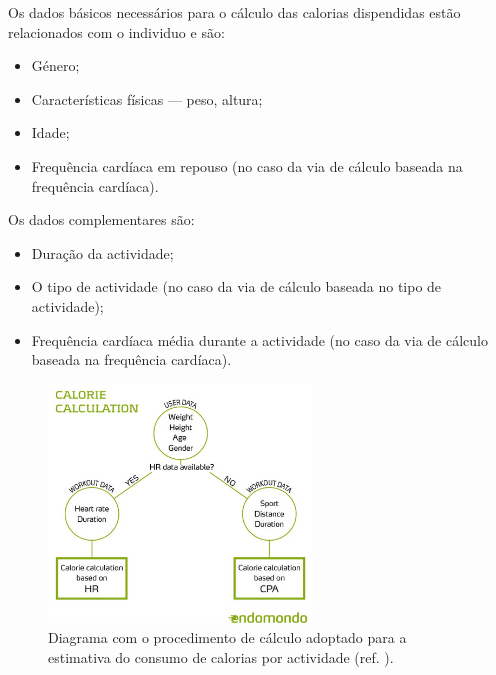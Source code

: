 \documentclass[a4paper,10pt]{report}
\begin{document}
Os dados básicos necessários para o cálculo das calorias dispendidas estão relacionados com o individuo e são:
\begin{itemize}
 \item Género;
 \item Características físicas --- peso, altura;
 \item Idade;
 \item Frequência cardíaca em repouso (no caso da via de cálculo baseada na frequência cardíaca).
\end{itemize}

Os dados complementares são:
\begin{itemize}
 \item Duração da actividade;
 \item O tipo de actividade (no caso da via de cálculo baseada no tipo de actividade);
 \item Frequência cardíaca média durante a actividade (no caso da via de cálculo baseada na frequência cardíaca).
\end{itemize}

\begin{figure}
\centering
\includegraphics[width=7cm]{endomondoCalories.jpg}
\caption{Diagrama com o procedimento de cálculo adoptado para a estimativa do consumo de calorias por actividade (ref. \cite{endomondo}).}
\label{fig:caloriasProcedimento}
\end{figure}
\end{document}
